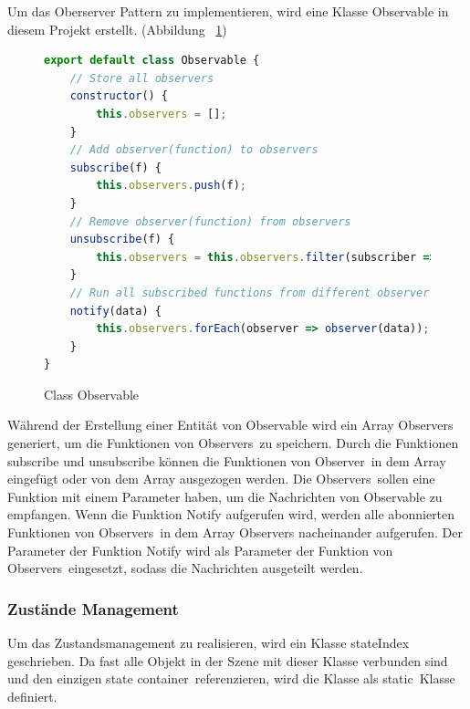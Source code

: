  Um das Oberserver Pattern zu implementieren, wird eine Klasse {\selectfont Observable} in diesem Projekt erstellt. (Abbildung ~\ref{fig:observable})
  
\begin{figure}[ht]
\vspace*{1em}
\centering
\caption[Class Observable]{Class Observable}
\begin{lstlisting}[language=JavaScript, style=htmlcssjs]
export default class Observable {
    // Store all observers
    constructor() {
        this.observers = [];
    }
    // Add observer(function) to observers
    subscribe(f) {
        this.observers.push(f);
    }
    // Remove observer(function) from observers
    unsubscribe(f) {
        this.observers = this.observers.filter(subscriber => subscriber !== f);
    }
    // Run all subscribed functions from different observer
    notify(data) {
        this.observers.forEach(observer => observer(data));
    }
}
\end{lstlisting}
\label{fig:observable} 
\end{figure}
  Während der Erstellung einer Entität von {\selectfont Observable} wird ein Array {\selectfont Observers} generiert, um die Funktionen von \glqq Observers\grqq\ zu speichern. Durch die Funktionen {\selectfont subscribe} und {\selectfont unsubscribe} können die Funktionen von \glqq Observer\grqq\ in dem Array eingefügt oder von dem Array ausgezogen werden. Die \glqq Observers\grqq\ sollen eine Funktion mit einem Parameter haben, um die Nachrichten von {\selectfont Observable} zu empfangen. Wenn die Funktion {\selectfont Notify} aufgerufen wird, werden alle abonnierten Funktionen von \glqq Observers\grqq\ in dem Array {\selectfont Observers} nacheinander aufgerufen. Der Parameter der Funktion {\selectfont Notify} wird als Parameter der Funktion von \glqq Observers\grqq\ eingesetzt, sodass die Nachrichten ausgeteilt werden.
  
  \subsubsection{Zustände Management}
  
  Um das Zustandsmanagement zu realisieren, wird ein Klasse {\selectfont stateIndex} geschrieben. Da fast alle Objekt in der Szene mit dieser Klasse verbunden sind und den einzigen \glqq state container\grqq\ referenzieren, wird die Klasse als \glqq static\grqq\ Klasse definiert.

